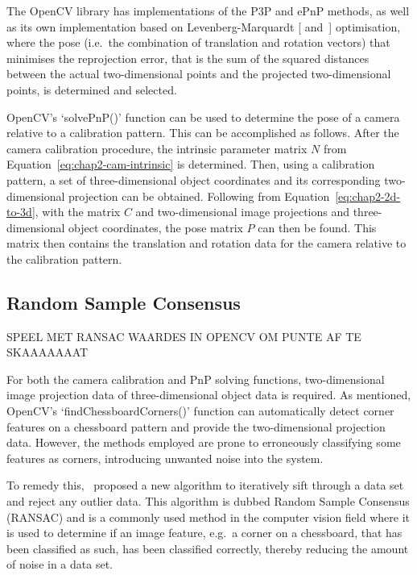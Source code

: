 The OpenCV library has implementations of the P3P and ePnP methods, as well as its own implementation based on Levenberg-Marquardt [\cite{levenberg1944method} and~\cite{marquardt1963algorithm}] optimisation, where the pose (i.e.\ the combination of translation and rotation vectors) that minimises the reprojection error, that is the sum of the squared distances between the actual two-dimensional points and the projected two-dimensional points, is determined and selected. 

OpenCV's `solvePnP()' function can be used to determine the pose of a camera relative to a calibration pattern. This can be accomplished as follows. After the camera calibration procedure, the intrinsic parameter matrix $N$ from Equation~\ref{eq:chap2-cam-intrinsic} is determined. Then, using a calibration pattern, a set of three-dimensional object coordinates and its corresponding two-dimensional projection can be obtained. Following from Equation~\ref{eq:chap2-2d-to-3d}, with the matrix $C$ and two-dimensional image projections and three-dimensional object coordinates, the pose matrix $P$ can then be found. This matrix then contains the translation and rotation data for the camera relative to the calibration pattern. 

\subsection{Random Sample Consensus}

SPEEL MET RANSAC WAARDES IN OPENCV OM PUNTE AF TE SKAAAAAAAT

For both the camera calibration and PnP solving functions, two-dimensional image projection data of three-dimensional object data is required. As mentioned, OpenCV's `findChessboardCorners()' function can automatically detect corner features on a chessboard pattern and provide the two-dimensional projection data. However, the methods employed are prone to erroneously classifying some features as corners, introducing unwanted noise into the system. 

To remedy this,~\cite{fischler1981random} proposed a new algorithm to iteratively sift through a data set and reject any outlier data. This algorithm is dubbed Random Sample Consensus (RANSAC) and is a commonly used method in the computer vision field where it is used to determine if an image feature, e.g.\ a corner on a chessboard, that has been classified as such, has been classified correctly, thereby reducing the amount of noise in a data set. 

